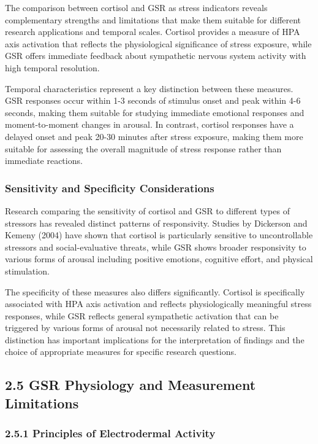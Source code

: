 \documentclass[11pt,a4paper]{article}
\begin{document}
The comparison between cortisol and GSR as stress indicators reveals complementary strengths and limitations that make
them suitable for different research applications and temporal scales. Cortisol provides a measure of HPA axis
activation that reflects the physiological significance of stress exposure, while GSR offers immediate feedback about
sympathetic nervous system activity with high temporal resolution.

Temporal characteristics represent a key distinction between these measures. GSR responses occur within 1-3 seconds of
stimulus onset and peak within 4-6 seconds, making them suitable for studying immediate emotional responses and
moment-to-moment changes in arousal. In contrast, cortisol responses have a delayed onset and peak 20-30 minutes after
stress exposure, making them more suitable for assessing the overall magnitude of stress response rather than immediate
reactions.

\subsubsection{Sensitivity and Specificity Considerations}

Research comparing the sensitivity of cortisol and GSR to different types of stressors has revealed distinct patterns of
responsivity. Studies by Dickerson and Kemeny (2004) have shown that cortisol is particularly sensitive to
uncontrollable stressors and social-evaluative threats, while GSR shows broader responsivity to various forms of arousal
including positive emotions, cognitive effort, and physical stimulation.

The specificity of these measures also differs significantly. Cortisol is specifically associated with HPA axis
activation and reflects physiologically meaningful stress responses, while GSR reflects general sympathetic activation
that can be triggered by various forms of arousal not necessarily related to stress. This distinction has important
implications for the interpretation of findings and the choice of appropriate measures for specific research questions.

\subsection{2.5 GSR Physiology and Measurement Limitations}

\subsubsection{2.5.1 Principles of Electrodermal Activity}
\end{document}
